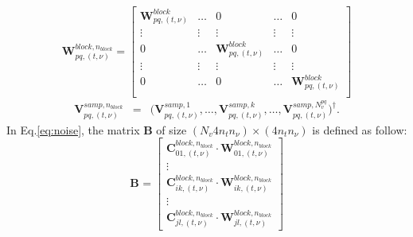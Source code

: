\documentclass[useAMS,usenatbib]{mn2e}
\begin{document}
\begin{equation*}
\mathbf{W}_{pq,(t,\nu)}^{block,n_{block}}=
  \begin{bmatrix}
    \mathbf{W}_{pq,(t,\nu)}^{block} &\dots & 0 & \dots & 0\\
    \vdots & \vdots & \vdots & \vdots & \vdots\\
    0 & \dots& \mathbf{W}_{pq,(t,\nu)}^{block} &\dots & 0\\
    \vdots & \vdots & \vdots & \vdots & \vdots \\
    0 & \dots& 0 &\dots & \mathbf{W}_{pq,(t,\nu)}^{block}\\
  \end{bmatrix}
\end{equation*}
\begin{eqnarray*}
\mathbf{V}_{pq,(t,\nu)}^{samp,n_{block}}&=&\Big(\mathbf{V}_{pq,(t,\nu)}^{samp,1},\dots, \mathbf{V}_{pq,(t,\nu)}^{samp,k}, \dots,
\mathbf{V}_{pq,(t,\nu)}^{samp,N^{pq}_v}\Big)^{\dagger}. 
\end{eqnarray*}
In Eq.\ref{eq:noise}, the matrix $\mathbf{B}$ of size $(N_v 4 n_t n_{\nu})\times (4 n_t n_{\nu})$ is defined as follow:
\begin{equation*}
\mathbf{B}_{}=
  \begin{bmatrix}
    \mathbf{C}_{01,(t,\nu)}^{block,n_{block}}\cdot \mathbf{W}_{01,(t,\nu)}^{block,n_{block}}\\
    \vdots\\
    \mathbf{C}_{ik,(t,\nu)}^{block,n_{block}}\cdot \mathbf{W}_{ik,(t,\nu)}^{block,n_{block}}\\
    \vdots \\
    \mathbf{C}_{jl,(t,\nu)}^{block,n_{block}}\cdot \mathbf{W}_{jl,(t,\nu)}^{block,n_{block}}
  \end{bmatrix}
\end{equation*}
\end{document}
